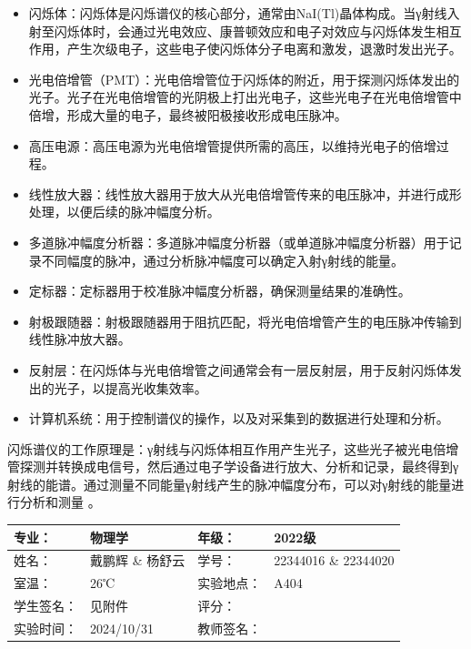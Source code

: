 \documentclass[dvipsnames, svgnames,a4paper,11pt]{article}
\begin{document}
	\begin{itemize}
		\item 闪烁体：闪烁体是闪烁谱仪的核心部分，通常由NaI(Tl)晶体构成。当γ射线入射至闪烁体时，会通过光电效应、康普顿效应和电子对效应与闪烁体发生相互作用，产生次级电子，这些电子使闪烁体分子电离和激发，退激时发出光子。
		\item 光电倍增管（PMT）：光电倍增管位于闪烁体的附近，用于探测闪烁体发出的光子。光子在光电倍增管的光阴极上打出光电子，这些光电子在光电倍增管中倍增，形成大量的电子，最终被阳极接收形成电压脉冲。
		\item 高压电源：高压电源为光电倍增管提供所需的高压，以维持光电子的倍增过程。
		\item 线性放大器：线性放大器用于放大从光电倍增管传来的电压脉冲，并进行成形处理，以便后续的脉冲幅度分析。
		\item 多道脉冲幅度分析器：多道脉冲幅度分析器（或单道脉冲幅度分析器）用于记录不同幅度的脉冲，通过分析脉冲幅度可以确定入射γ射线的能量。
		\item 定标器：定标器用于校准脉冲幅度分析器，确保测量结果的准确性。
		\item 射极跟随器：射极跟随器用于阻抗匹配，将光电倍增管产生的电压脉冲传输到线性脉冲放大器。
		\item 反射层：在闪烁体与光电倍增管之间通常会有一层反射层，用于反射闪烁体发出的光子，以提高光收集效率。
		\item 计算机系统：用于控制谱仪的操作，以及对采集到的数据进行处理和分析。
	\end{itemize}
	

	闪烁谱仪的工作原理是：γ射线与闪烁体相互作用产生光子，这些光子被光电倍增管探测并转换成电信号，然后通过电子学设备进行放大、分析和记录，最终得到γ射线的能谱。通过测量不同能量γ射线产生的脉冲幅度分布，可以对γ射线的能量进行分析和测量
。






\clearpage
\begin{table}
	\renewcommand\arraystretch{1.7}
	\centering
	\begin{tabularx}{\textwidth}{|X|X|X|X|}
	\hline
	专业：& 物理学 &年级：& 2022级 \\
	\hline
	姓名：& 戴鹏辉 \& 杨舒云 & 学号：& 22344016 \& 22344020 \\
	\hline
	室温：& 26℃ & 实验地点： & A404 \\
	\hline
	学生签名：& 见附件 & 评分： &\\
	\hline
	实验时间：& 2024/10/31& 教师签名：&\\
	\hline
	\end{tabularx}
\end{table}
\end{document}
